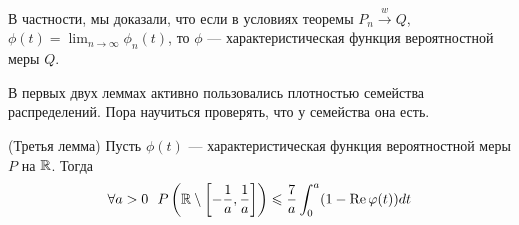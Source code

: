 \begin{note}
    В частности, мы доказали, что если в условиях теоремы $P_n \xrightarrow{w} Q$, $\phi(t) = \lim_{n \to \infty} \phi_n(t)$, то $\phi$ --- характеристическая функция вероятностной меры $Q$.
\end{note}

\begin{note}
    В первых двух леммах активно пользовались плотностью семейства распределений. Пора научиться проверять, что у семейства она есть.
\end{note}

\begin{lemma} (Третья лемма)
    Пусть $\phi(t)$ --- характеристическая функция вероятностной меры $P$ на $\mathbb{R}$. Тогда
    \[
        \forall a > 0\ \ P\left(\mathbb{R} \setminus \left[-\frac{1}{a}, \frac{1}{a}\right]\right) \leqslant \frac{7}{a} \int_0^a (1 - \operatorname{Re}\varphi(t))dt
    \]
\end{lemma}

